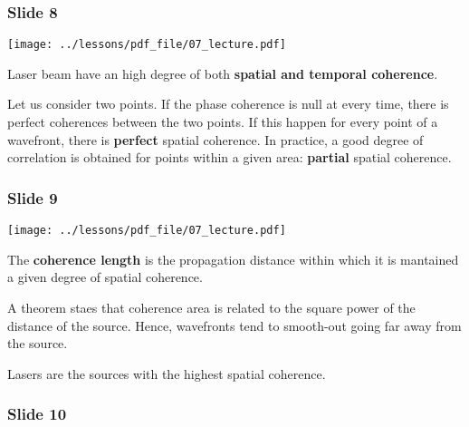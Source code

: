 \documentclass[../main/main.tex]{subfiles}
\begin{document}
\subsubsection*{Slide 8}

\begin{minipage}[]{0.5\linewidth}
\centering
\texttt{[image: ../lessons/pdf\_file/07\_lecture.pdf]}
\end{minipage}
\hspace{0.3cm}\vspace{0.3cm}
\begin{minipage}[c]{0.47\linewidth}

Laser beam have an high degree of both \textbf{spatial and temporal coherence}.

Let us consider two points. If the phase coherence is null at every time, there is perfect coherences between the two points. If this happen for every point of a wavefront, there is \textbf{perfect} spatial coherence. In practice, a good degree of correlation is obtained for points within a given area: \textbf{partial} spatial coherence.


\end{minipage}

\subsubsection*{Slide 9}

\begin{minipage}[]{0.5\linewidth}
\centering
\texttt{[image: ../lessons/pdf\_file/07\_lecture.pdf]}
\end{minipage}
\hspace{0.3cm}\vspace{0.3cm}
\begin{minipage}[c]{0.47\linewidth}

The \textbf{coherence length} is the propagation distance within which it is mantained a given degree of spatial coherence.

A theorem staes that coherence area is related to the square power of the distance of the source. Hence, wavefronts tend to smooth-out going far away from the source.

Lasers are the sources with the highest spatial coherence.

\end{minipage}

\subsubsection*{Slide 10}
\end{document}
